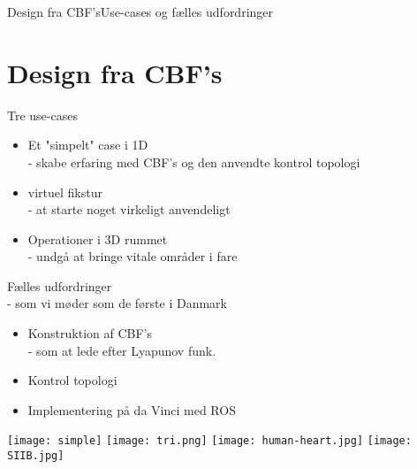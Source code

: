 \begin{frame}{Design fra CBF's}{Use-cases og fælles udfordringer}
\section{Design fra CBF's}
\begin{minipage}{0.5\textwidth}
	\begin{block}{Tre use-cases}
		\begin{itemize}
			\item Et "simpelt" case i 1D \\ \scriptsize{ - skabe erfaring med CBF's og den anvendte kontrol topologi}
			\item  \normalsize virtuel fikstur \\ \scriptsize - at starte noget virkeligt anvendeligt
			\item \normalsize  Operationer i 3D rummet \\  \scriptsize - undgå at bringe vitale områder i fare
		\end{itemize}
	\end{block}
	\begin{block}{Fælles udfordringer\\ \scriptsize {\color{white}{lol}} - som vi møder som de første i Danmark}
		\begin{itemize}
			\item Konstruktion af CBF's \\ \scriptsize - som at lede efter Lyapunov funk.
			\item \normalsize Kontrol topologi
			\item Implementering på da Vinci med ROS
		\end{itemize}
	\end{block}
\end{minipage}
\hspace{0.3cm}
\begin{minipage}{0.45\textwidth}
\texttt{[image: simple]}
\texttt{[image: tri.png]}
\vspace{0.2cm}
\texttt{[image: human-heart.jpg]}
\vspace{0.2cm}
\texttt{[image: SIIB.jpg]}
\vspace{0.2cm}
\end{minipage}
\end{frame}


